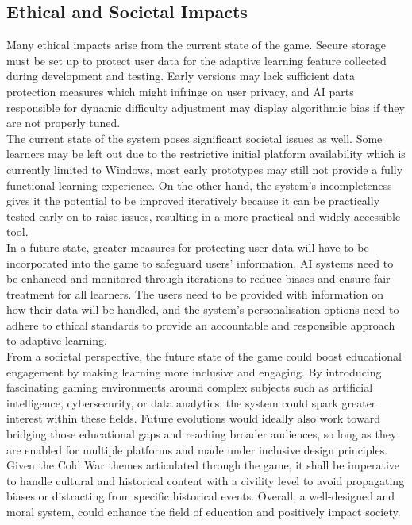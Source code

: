 \documentclass[11pt, a4paper]{article}
\begin{document}
\subsection{Ethical and Societal Impacts}

\noindent Many ethical impacts arise from the current state of the game. Secure storage must be set up to protect user data for the adaptive learning feature collected during development and testing. Early versions may lack sufficient data protection measures which might infringe on user privacy, and AI parts responsible for dynamic difficulty adjustment may display algorithmic bias if they are not properly tuned. \\

\noindent The current state of the system poses significant societal issues as well. Some learners may be left out due to the restrictive initial platform availability which is currently limited to Windows, most early prototypes may still not provide a fully functional learning experience. On the other hand, the system’s incompleteness gives it the potential to be improved iteratively because it can be practically tested early on to raise issues, resulting in a more practical and widely accessible tool. \\

\noindent In a future state, greater measures for protecting user data will have to be incorporated into the game to safeguard users' information. AI systems need to be enhanced and monitored through iterations to reduce biases and ensure fair treatment for all learners. The users need to be provided with information on how their data will be handled, and the system’s personalisation options need to adhere to ethical standards to provide an accountable and responsible approach to adaptive learning. \\

\noindent From a societal perspective, the future state of the game could boost educational engagement by making learning more inclusive and engaging. By introducing fascinating gaming environments around complex subjects such as artificial intelligence, cybersecurity, or data analytics, the system could spark greater interest within these fields. Future evolutions would ideally also work toward bridging those educational gaps and reaching broader audiences, so long as they are enabled for multiple platforms and made under inclusive design principles. Given the Cold War themes articulated through the game, it shall be imperative to handle cultural and historical content with a civility level to avoid propagating biases or distracting from specific historical events. Overall, a well-designed and moral system, could enhance the field of education and positively impact society.
\end{document}
